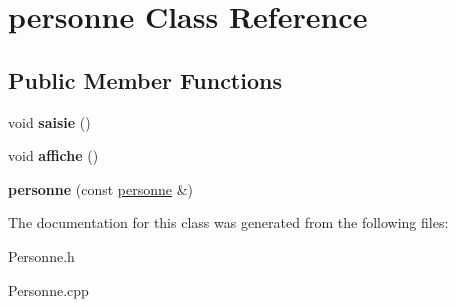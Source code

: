 \hypertarget{classpersonne}{}\section{personne Class Reference}
\label{classpersonne}
\subsection*{Public Member Functions}
\begin{DoxyCompactItemize}
\item 
\mbox{\label{classpersonne_ad124ebabb5c5a015c2f71a7d62308027}} 
void {\bfseries saisie} ()
\item 
\mbox{\label{classpersonne_a04a8768e8275a3bc8ebf123aeb6ffe3f}} 
void {\bfseries affiche} ()
\item 
\mbox{\label{classpersonne_a5f0140cb6d82a9922b32136eeae6c846}} 
{\bfseries personne} (const \mbox{\hyperlink{classpersonne}{personne}} \&)
\end{DoxyCompactItemize}


The documentation for this class was generated from the following files\+:\begin{DoxyCompactItemize}
\item 
Personne.\+h\item 
Personne.\+cpp\end{DoxyCompactItemize}
